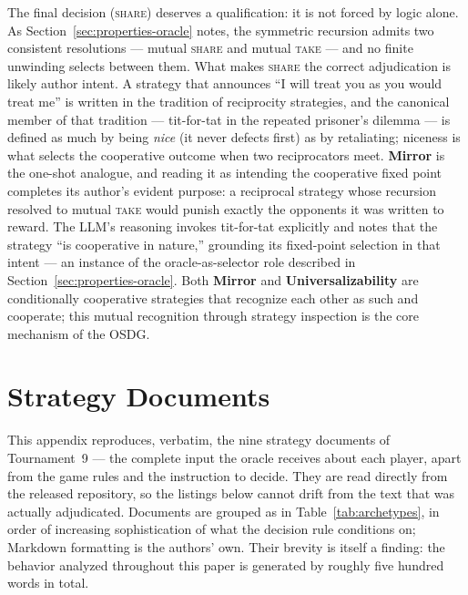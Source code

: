 The final decision (\textup{\textsc{share}}) deserves a
qualification: it is not forced by logic alone.
As Section~\ref{sec:properties-oracle} notes, the symmetric
recursion admits two consistent resolutions --- mutual
\textup{\textsc{share}} and mutual \textup{\textsc{take}} --- and
no finite unwinding selects between them.
What makes \textup{\textsc{share}} the correct adjudication is
likely author intent.
A strategy that announces ``I will treat you as you would treat
me'' is written in the tradition of reciprocity strategies, and the
canonical member of that tradition --- tit-for-tat in the repeated
prisoner's dilemma \citep{axelrod1980effective} --- is defined as
much by being \emph{nice} (it never defects first) as by
retaliating; niceness is what selects the cooperative outcome when
two reciprocators meet.
\textbf{Mirror} is the one-shot analogue, and reading it as
intending the cooperative fixed point completes its author's
evident purpose: a reciprocal strategy whose recursion resolved to
mutual \textup{\textsc{take}} would punish exactly the opponents it
was written to reward.
The LLM's reasoning invokes tit-for-tat explicitly and notes that
the strategy ``is cooperative in nature,'' grounding its
fixed-point selection in that intent --- an instance of the
oracle-as-selector role described in
Section~\ref{sec:properties-oracle}.
Both \textbf{Mirror} and \textbf{Universalizability} are
conditionally cooperative strategies that recognize each other as
such and cooperate; this mutual recognition through strategy
inspection is the core mechanism of the OSDG.


\section{Strategy Documents}
\label{sec:appendix-strategies}

This appendix reproduces, verbatim, the nine strategy documents of
Tournament~9 --- the complete input the oracle receives about each
player, apart from the game rules and the instruction to decide.
They are read directly from the released repository, so the
listings below cannot drift from the text that was actually
adjudicated.
Documents are grouped as in Table~\ref{tab:archetypes}, in order of
increasing sophistication of what the decision rule conditions on;
Markdown formatting is the authors' own.
Their brevity is itself a finding: the behavior analyzed throughout
this paper is generated by roughly five hundred words in total.

